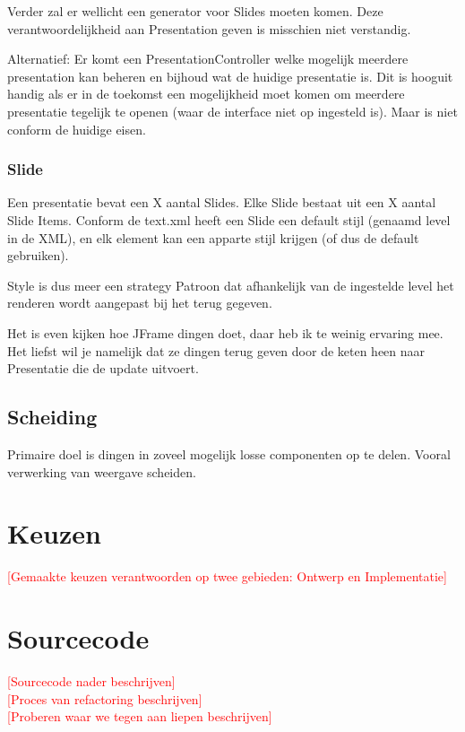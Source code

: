 \documentclass[a4paper]{article}
\newcommand{\todo}[1]{\textcolor{red}{[#1]}}
\begin{document}
Verder zal er wellicht een generator voor Slides moeten komen. Deze
verantwoordelijkheid aan Presentation geven is misschien niet verstandig.

Alternatief: Er komt een PresentationController welke mogelijk meerdere
presentation kan beheren en bijhoud wat de huidige presentatie is. Dit is
hooguit handig als er in de toekomst een mogelijkheid moet komen om meerdere
presentatie tegelijk te openen (waar de interface niet op ingesteld is). Maar is
niet conform de huidige eisen.

\subsubsection{Slide}
Een presentatie bevat een X aantal Slides. Elke Slide bestaat uit een X aantal
Slide Items. Conform de text.xml heeft een Slide een default stijl (genaamd
level in de XML), en elk element kan een apparte stijl krijgen (of dus de
default gebruiken).

Style is dus meer een strategy Patroon dat afhankelijk van de ingestelde level
het renderen wordt aangepast bij het terug gegeven.

Het is even kijken hoe JFrame dingen doet, daar heb ik te weinig ervaring mee.
Het liefst wil je namelijk dat ze dingen terug geven door de keten heen naar
Presentatie die de update uitvoert.

\subsection{Scheiding}
Primaire doel is dingen in zoveel mogelijk losse componenten op te delen.
Vooral verwerking van weergave scheiden.

\section{Keuzen}
\todo{Gemaakte keuzen verantwoorden op twee gebieden: Ontwerp en Implementatie}


\section{Sourcecode}
\todo{Sourcecode nader beschrijven}
\\
\todo{Proces van refactoring beschrijven}
\\
\todo{Proberen waar we tegen aan liepen beschrijven}
\end{document}
